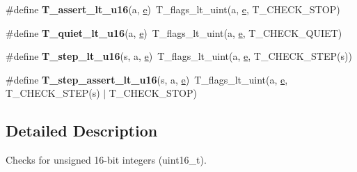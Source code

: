 \begin{DoxyCompactItemize}
\item 
\mbox{\label{group__RTEMSTestFrameworkChecksUInt16_ga7522a72d73d2dcc171eb17d3f27dca90}} 
\#define {\bfseries T\+\_\+assert\+\_\+lt\+\_\+u16}(a,  \mbox{\hyperlink{sun4u_2tte_8h_a8b0b9ed08e0e18920ec2682f48228c27}{e}})~T\+\_\+flags\+\_\+lt\+\_\+uint(a, \mbox{\hyperlink{sun4u_2tte_8h_a8b0b9ed08e0e18920ec2682f48228c27}{e}}, T\+\_\+\+C\+H\+E\+C\+K\+\_\+\+S\+T\+OP)
\item 
\mbox{\label{group__RTEMSTestFrameworkChecksUInt16_ga13debf2fe81d577f618582cfda4d8cd1}} 
\#define {\bfseries T\+\_\+quiet\+\_\+lt\+\_\+u16}(a,  \mbox{\hyperlink{sun4u_2tte_8h_a8b0b9ed08e0e18920ec2682f48228c27}{e}})~T\+\_\+flags\+\_\+lt\+\_\+uint(a, \mbox{\hyperlink{sun4u_2tte_8h_a8b0b9ed08e0e18920ec2682f48228c27}{e}}, T\+\_\+\+C\+H\+E\+C\+K\+\_\+\+Q\+U\+I\+ET)
\item 
\mbox{\label{group__RTEMSTestFrameworkChecksUInt16_gab11a277a8b037a4a1a62d4cd591e639e}} 
\#define {\bfseries T\+\_\+step\+\_\+lt\+\_\+u16}(s,  a,  \mbox{\hyperlink{sun4u_2tte_8h_a8b0b9ed08e0e18920ec2682f48228c27}{e}})~T\+\_\+flags\+\_\+lt\+\_\+uint(a, \mbox{\hyperlink{sun4u_2tte_8h_a8b0b9ed08e0e18920ec2682f48228c27}{e}}, T\+\_\+\+C\+H\+E\+C\+K\+\_\+\+S\+T\+EP(s))
\item 
\mbox{\label{group__RTEMSTestFrameworkChecksUInt16_gaaab9e78766cab6af0cb0a23ad73534ec}} 
\#define {\bfseries T\+\_\+step\+\_\+assert\+\_\+lt\+\_\+u16}(s,  a,  \mbox{\hyperlink{sun4u_2tte_8h_a8b0b9ed08e0e18920ec2682f48228c27}{e}})~T\+\_\+flags\+\_\+lt\+\_\+uint(a, \mbox{\hyperlink{sun4u_2tte_8h_a8b0b9ed08e0e18920ec2682f48228c27}{e}}, T\+\_\+\+C\+H\+E\+C\+K\+\_\+\+S\+T\+EP(s) $\vert$ T\+\_\+\+C\+H\+E\+C\+K\+\_\+\+S\+T\+OP)
\end{DoxyCompactItemize}


\subsection{Detailed Description}
Checks for unsigned 16-\/bit integers (uint16\+\_\+t). 

